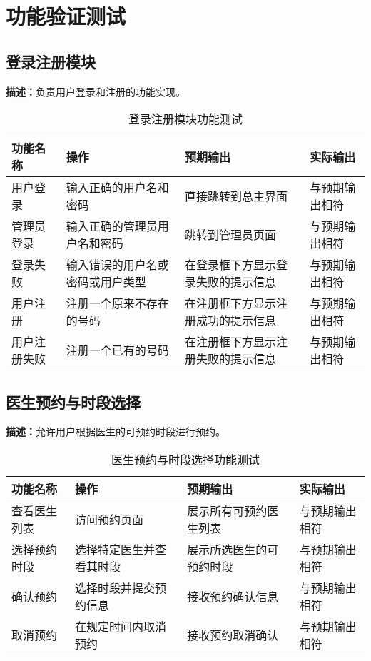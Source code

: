 \section{功能验证测试}
\subsection{登录注册模块}
\textbf{描述：}负责用户登录和注册的功能实现。
\begin{table}[h]
	\centering
	\begin{tabularx}{\textwidth}{|X|X|X|X|}
		\hline
		\textbf{功能名称} & \textbf{操作} & \textbf{预期输出} & \textbf{实际输出} \\
		\hline
		用户登录 & 输入正确的用户名和密码 & 直接跳转到总主界面 & 与预期输出相符 \\
		管理员登录 & 输入正确的管理员用户名和密码 & 跳转到管理员页面 & 与预期输出相符 \\
		登录失败 & 输入错误的用户名或密码或用户类型 & 在登录框下方显示登录失败的提示信息 & 与预期输出相符 \\
		用户注册 & 注册一个原来不存在的号码 & 在注册框下方显示注册成功的提示信息 & 与预期输出相符 \\
		用户注册失败 & 注册一个已有的号码 & 在注册框下方显示注册失败的提示信息 & 与预期输出相符 \\
		\hline
	\end{tabularx}
	\caption{登录注册模块功能测试}
\end{table}
\subsection{医生预约与时段选择}
\textbf{描述：}允许用户根据医生的可预约时段进行预约。

\begin{table}[h]
	\centering
	\begin{tabular}{|l|l|l|l|}
		\hline
		\textbf{功能名称} & \textbf{操作} & \textbf{预期输出} & \textbf{实际输出} \\
		\hline
		查看医生列表 & 访问预约页面 & 展示所有可预约医生列表 & 与预期输出相符 \\
		选择预约时段 & 选择特定医生并查看其时段 & 展示所选医生的可预约时段 & 与预期输出相符 \\
		确认预约 & 选择时段并提交预约信息 & 接收预约确认信息 & 与预期输出相符 \\
		取消预约 & 在规定时间内取消预约 & 接收预约取消确认 & 与预期输出相符 \\
		\hline
	\end{tabular}
	\caption{医生预约与时段选择功能测试}
\end{table}
